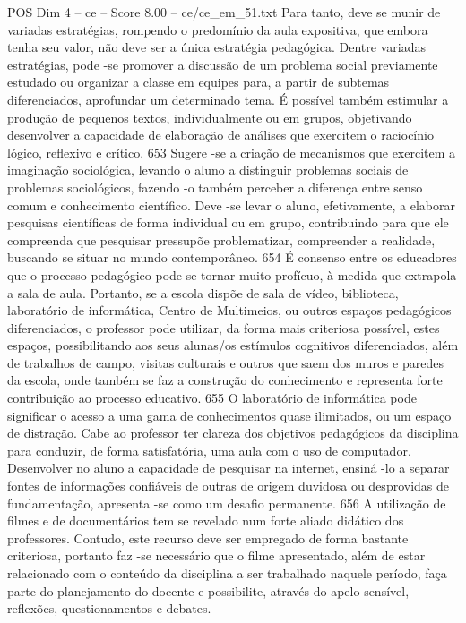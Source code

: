 \begin{textsample}{POS Dim 4 – ce – Score 8.00 – ce/ce\_em\_51.txt}
Para tanto, deve se munir de variadas estratégias, rompendo o predomínio da aula expositiva, que embora tenha seu valor, não deve ser a única estratégia pedagógica.
Dentre variadas estratégias, pode -se promover a discussão de um problema social previamente estudado ou organizar a classe em equipes para, a partir de subtemas diferenciados, aprofundar um determinado tema.
É possível também estimular a produção de pequenos textos, individualmente ou em grupos, objetivando desenvolver a capacidade de elaboração de análises que exercitem o raciocínio lógico, reflexivo e crítico. 653 Sugere -se a criação de mecanismos que exercitem a imaginação sociológica, levando o aluno a distinguir problemas sociais de problemas sociológicos, fazendo -o também perceber a diferença entre senso comum e conhecimento científico.
Deve -se levar o aluno, efetivamente, a elaborar pesquisas científicas de forma individual ou em grupo, contribuindo para que ele compreenda que pesquisar pressupõe problematizar, compreender a realidade, buscando se situar no mundo contemporâneo. 654 É consenso entre os educadores que o processo pedagógico pode se tornar muito profícuo, à medida que extrapola a sala de aula.
Portanto, se a escola dispõe de sala de vídeo, biblioteca, laboratório de informática, Centro de Multimeios, ou outros espaços pedagógicos diferenciados, o professor pode utilizar, da forma mais criteriosa possível, estes espaços, possibilitando aos seus alunas/os estímulos cognitivos diferenciados, além de trabalhos de campo, visitas culturais e outros que saem dos muros e paredes da escola, onde também se faz a construção do conhecimento e representa forte contribuição ao processo educativo. 655 O laboratório de informática pode significar o acesso a uma gama de conhecimentos quase ilimitados, ou um espaço de distração.
Cabe ao professor ter clareza dos objetivos pedagógicos da disciplina para conduzir, de forma satisfatória, uma aula com o uso de computador.
Desenvolver no aluno a capacidade de pesquisar na internet, ensiná -lo a separar fontes de informações confiáveis de outras de origem duvidosa ou desprovidas de fundamentação, apresenta -se como um desafio permanente. 656 A utilização de filmes e de documentários tem se revelado num forte aliado didático dos professores.
Contudo, este recurso deve ser empregado de forma bastante criteriosa, portanto faz -se necessário que o filme apresentado, além de estar relacionado com o conteúdo da disciplina a ser trabalhado naquele período, faça parte do planejamento do docente e possibilite, através do apelo sensível, reflexões, questionamentos e debates.

\end{textsample}
